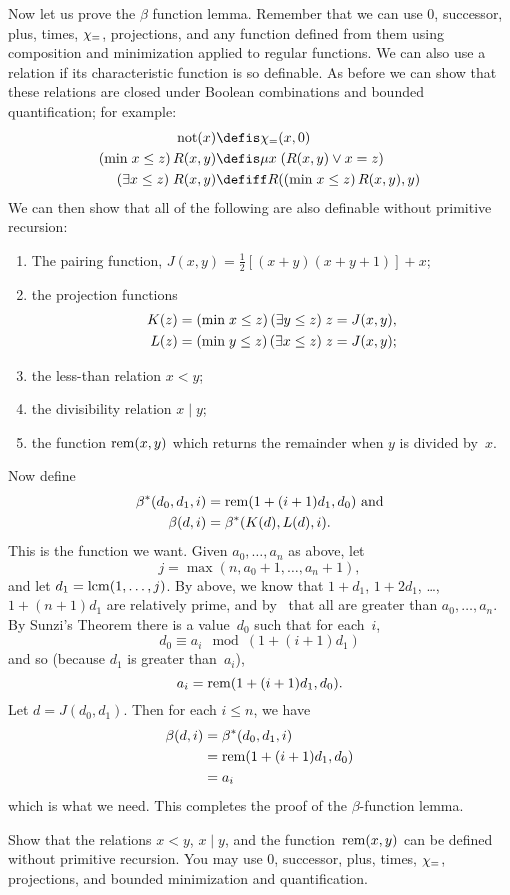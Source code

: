 \documentclass[../../../include/open-logic-section]{subfiles}
\begin{document}
Now let us prove the $\beta$ function lemma. Remember that we can use
$0$, successor, plus, times, $\chi_{=}$, projections, and any function
defined from them using composition and minimization applied to
regular functions. We can also use a relation if its characteristic
function is so definable. As before we can show that these relations
are closed under Boolean combinations and bounded quantification; for
example:
\begin{align*}
\fn{not}(x) & \defis \Char{=}(x,0)\\
\bmin{x \leq z}{R(x,y)} & \defis \umin{x}{(R(x,y) \lor x = z)}\\
\bexists{x \leq z}{R(x,y)} & \defiff R(\bmin{x \leq z}{R(x,y)}, y)
\end{align*}
We can then show that all of the following are also definable without
primitive recursion:
\begin{enumerate}
\item The pairing function, $J(x,y) = \frac{1}{2}[(x+y)(x+y+1)] + x$;
\item the projection functions
\begin{align*}
K(z) & = (\mathrm{min} \; x \leq z)\, (\exists y \leq z)\; z = J(x,y),\\
L(z) & = (\mathrm{min} \; y \leq z)\, (\exists x \leq z)\; z = J(x,y);
\end{align*}
\item the less-than relation $x < y$;
\item the divisibility relation $x \mid y$;
\item the function $\mathrm{rem}(x,y)$ which returns the remainder when
  $y$ is divided by~$x$.
\end{enumerate}
Now define
\begin{align*}
\beta^*(d_0,d_1,i) & = \mathrm{rem}(1+(i+1) d_1,d_0) \text{ and}\\
\beta(d,i) & = \beta^*(K(d),L(d),i).
\end{align*}
This is the function we want. Given $a_0,\dots,a_n$ as above, let
\[
j = \max(n,a_0+1,\dots,a_n+1),
\]
and let $d_1 = \operatorname{lcm}(1,\dots,j)$. By  above,
we know that $1+d_1$, $1+2 d_1$, \dots, $1+(n+1) d_1$ are relatively
prime, and by~ that all are greater than $a_0,\dots,a_n$.
By Sunzi's Theorem there is a value~$d_0$ such that for each~$i$,
\[
d_0 \equiv a_i \mod (1+(i+1)d_1)
\]
and so (because $d_1$ is greater than~$a_i$),
\[
a_i = \mathrm{rem}(1+(i+1)d_1,d_0).
\]
Let $d = J(d_0,d_1)$. Then for each $i \le n$, we have
\begin{align*}
\beta(d,i) & =  \beta^*(d_0,d_1,i) \\
& =  \mathrm{rem}(1+(i+1) d_1,d_0) \\
& =  a_i
\end{align*}
which is what we need. This completes the proof of the
$\beta$-function lemma.

\begin{prob}
  Show that the relations $x < y$, $x \mid y$, and the
  function~$\mathrm{rem}(x,y)$ can be defined without primitive recursion.
  You may use $0$, successor, plus, times, $\chi_{=}$, projections,
  and bounded minimization and quantification.
\end{prob}
\end{document}
